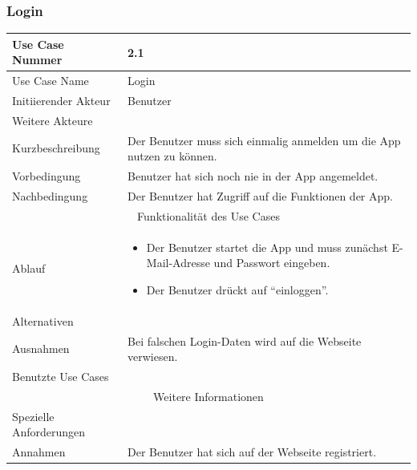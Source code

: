 \documentclass[10pt,a4paper]{article}
\begin{document}
\subsubsection{Login}
	\begin{tabularx}{\textwidth}{|l|X|}
	\hline Use Case Nummer & 2.1 \\ 
	\hline Use Case Name & Login \\ 
	\hline Initiierender Akteur & Benutzer \\
	\hline Weitere Akteure &  \\
	\hline Kurzbeschreibung & Der Benutzer muss sich einmalig anmelden um die App nutzen zu können. \\
	\hline Vorbedingung & Benutzer hat sich noch nie in der App angemeldet. \\
	\hline Nachbedingung & Der Benutzer hat Zugriff auf die Funktionen der App. \\
	\hline \multicolumn{2}{|c|}{Funktionalität des Use Cases}\\
	\hline Ablauf & \begin{itemize}
		\item Der Benutzer startet die App und muss zunächst E-Mail-Adresse und Passwort eingeben.
		\item Der Benutzer drückt auf ``einloggen''.
	\end{itemize} \\
	\hline Alternativen &  \\
	\hline Ausnahmen & Bei falschen Login-Daten wird auf die Webseite verwiesen. \\
	\hline Benutzte Use Cases &  \\
	\hline \multicolumn{2}{|c|}{Weitere Informationen} \\
	\hline Spezielle Anforderungen &  \\
	\hline Annahmen & Der Benutzer hat sich auf der Webseite registriert. \\
	\hline
	\end{tabularx}
\end{document}
